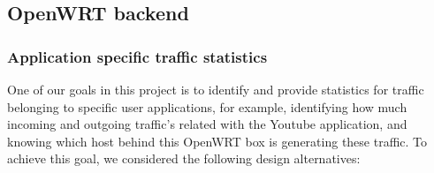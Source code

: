\subsection{OpenWRT backend}
\subsubsection{Application specific traffic statistics}
\label{sec:app-specific-design}

One of our goals in this project is to identify and provide statistics for traffic belonging to specific user applications, for example, identifying how much incoming and outgoing traffic's related with the Youtube application, and knowing which host behind this OpenWRT box is generating these traffic. To achieve this goal, we considered the following design alternatives:

